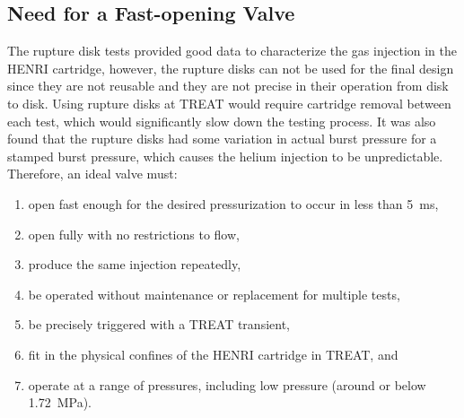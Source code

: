 \subsection{Need for a Fast-opening Valve} \label{ss:need for valve}


The rupture disk tests provided good data to characterize the gas injection in the HENRI cartridge, however, the rupture disks can not be used for the final design since they are not reusable and they are not precise in their operation from disk to disk. Using rupture disks at TREAT would require cartridge removal between each test, which would significantly slow down the testing process. It was also found that the rupture disks had some variation in actual burst pressure for a stamped burst pressure, which causes the helium injection to be unpredictable. Therefore, an ideal valve must:
\begin{enumerate}
    \item open fast enough for the desired pressurization to occur in less than \SI{5}{\milli\second},
    \item open fully with no restrictions to flow,
    \item produce the same injection repeatedly,
    \item be operated without maintenance or replacement for multiple tests,
    \item be precisely triggered with a TREAT transient,
    \item fit in the physical confines of the HENRI cartridge in TREAT, and
    \item operate at a range of pressures, including low pressure (around or below \SI{1.72}{\mega\pascal}).
\end{enumerate}

